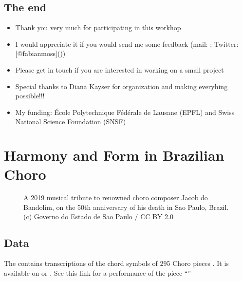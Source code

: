 \documentclass[letterpaper,10pt,english]{sphinxmanual}
\begin{document}
\section{The end}
\label{\detokenize{data-driven_music_history:the-end}}\begin{itemize}
\item {} 
Thank you very much for participating in this workhop

\item {} 
I would appreciate it if you would send me some feedback (mail:
; Twitter:
{[}@fabianmoss{]}())

\item {} 
Please get in touch if you are interested in working on a small
project

\item {} 
Special thanks to Diana Kayser for organization and making everyhing
possible!!!

\item {} 
My funding: École Polytechnique Fédérale de Lausane (EPFL) and Swiss
National Science Foundation (SNSF)

\end{itemize}


\chapter{Harmony and Form in Brazilian Choro}
\label{\detokenize{choro:harmony-and-form-in-brazilian-choro}}\label{\detokenize{choro::doc}}
\begin{figure}[htbp]
\centering
\capstart

\noindent{}
\caption{A 2019 musical tribute to renowned choro composer Jacob do Bandolim,
on the 50th anniversary of his death in Sao Paulo, Brazil. (c) Governo do Estado de Sao Paulo / CC BY 2.0}\label{\detokenize{choro:id3}}\end{figure}


\section{Data}
\label{\detokenize{choro:data}}
The  contains transcriptions of the chord symbols
of 295 Choro pieces . It is available on  or .
See this link for a performance of the piece “”
\end{document}
